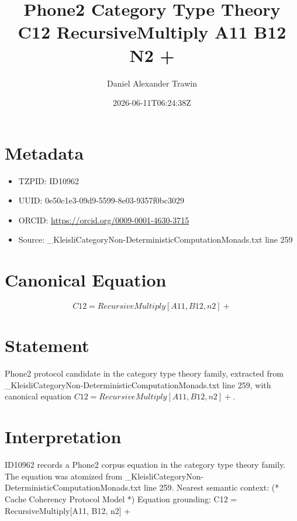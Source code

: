 \documentclass[11pt]{article}
\title{Phone2 Category Type Theory C12 RecursiveMultiply A11 B12 N2 +}
\author{Daniel Alexander Trawin}
\date{2026-06-11T06:24:38Z}
\begin{document}
\maketitle
\section*{Metadata}
\begin{itemize}
\item TZPID: ID10962
\item UUID: 0e50c1e3-09d9-5599-8e03-9357f0bc3029
\item ORCID: \url{https://orcid.org/0009-0001-4630-3715}
\item Source: _KleisliCategoryNon-DeterministicComputationMonads.txt line 259
\end{itemize}
\section*{Canonical Equation}
\[
C12 = RecursiveMultiply[A11, B12, n2] +
\]
\section*{Statement}
Phone2 protocol candidate in the category type theory family, extracted from _KleisliCategoryNon-DeterministicComputationMonads.txt line 259, with canonical equation $C12 = RecursiveMultiply[A11, B12, n2] +$.
\section*{Interpretation}
ID10962 records a Phone2 corpus equation in the category type theory family. The equation was atomized from _KleisliCategoryNon-DeterministicComputationMonads.txt line 259. Nearest semantic context: (* Cache Coherency Protocol Model *) Equation grounding: C12 = RecursiveMultiply[A11, B12, n2] +
\end{document}
